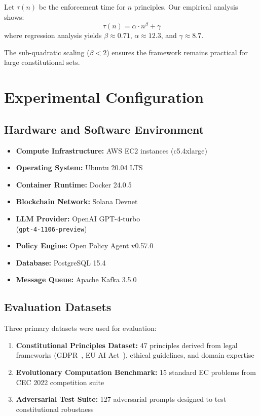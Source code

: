 Let $\tau(n)$ be the enforcement time for $n$ principles. Our empirical analysis shows:
\[\tau(n) = \alpha \cdot n^{\beta} + \gamma\]
where regression analysis yields $\beta \approx 0.71$, $\alpha \approx 12.3$\ms{}, and $\gamma \approx 8.7$\ms{}.

The sub-quadratic scaling ($\beta < 2$) ensures the framework remains practical for large constitutional sets.

\section{Experimental Configuration}\label{sec:appendix_experimental}

\subsection{Hardware and Software Environment}
\begin{itemize}[leftmargin=*,topsep=2pt,itemsep=2pt,parsep=0pt]
    \item \textbf{Compute Infrastructure:} AWS EC2 instances (c5.4xlarge)
    \item \textbf{Operating System:} Ubuntu 20.04 LTS
    \item \textbf{Container Runtime:} Docker 24.0.5
    \item \textbf{Blockchain Network:} Solana Devnet
    \item \textbf{LLM Provider:} OpenAI GPT-4-turbo \\
    (\texttt{gpt-4-1106-preview})
    \item \textbf{Policy Engine:} Open Policy Agent v0.57.0
    \item \textbf{Database:} PostgreSQL 15.4
    \item \textbf{Message Queue:} Apache Kafka 3.5.0
\end{itemize}

\subsection{Evaluation Datasets}
Three primary datasets were used for evaluation:

\begin{enumerate}
    \item \textbf{Constitutional Principles Dataset:} 47 principles derived from legal frameworks (GDPR~\cite{gdpr2016}, EU AI Act~\cite{eu2024ai}), ethical guidelines, and domain expertise
    \item \textbf{Evolutionary Computation Benchmark:} 15 standard EC problems from CEC 2022 competition suite
    \item \textbf{Adversarial Test Suite:} 127 adversarial prompts designed to test constitutional robustness
\end{enumerate}

